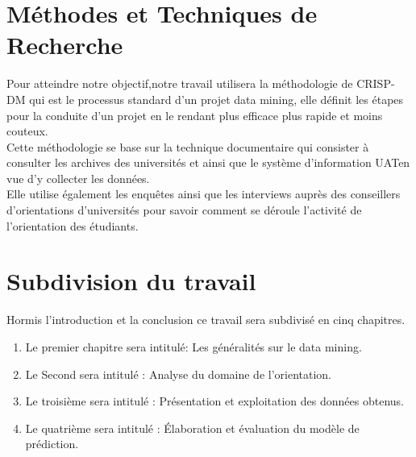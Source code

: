 \section{Méthodes et Techniques de Recherche}
Pour atteindre notre objectif,notre  travail utilisera la méthodologie de \ac{CRISP-DM} qui est le processus standard d’un projet data mining, elle définit les étapes pour la conduite d’un projet en le rendant plus efficace plus rapide et moins couteux. \cite{DMProces}  \\
Cette méthodologie se base sur la technique documentaire qui consister à consulter les archives des universités et ainsi que le système d'information \ac{UAT}en vue d'y collecter les données. \\
Elle utilise également les enquêtes ainsi que les interviews auprès des conseillers d'orientations d'universités pour savoir comment se déroule l'activité de l'orientation des étudiants.
\section{Subdivision du travail}
Hormis l'introduction et la conclusion ce travail sera subdivisé en cinq chapitres.  
\begin{enumerate}
	\item Le premier chapitre sera intitulé: Les généralités sur le data mining.
	\item Le Second sera intitulé : Analyse du domaine de l'orientation.
	\item Le troisième sera intitulé : Présentation et exploitation des données obtenus. 
	\item Le quatrième sera intitulé : Élaboration  et évaluation du modèle de prédiction.
\end{enumerate}
